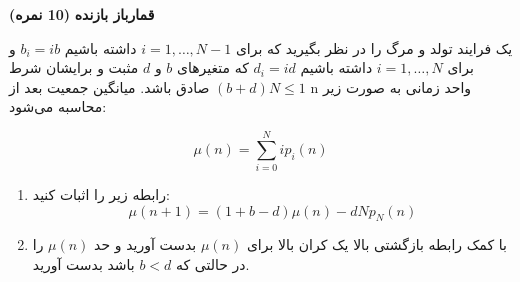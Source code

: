 \Large \textbf{قمارباز بازنده}
\large \textbf{(10 نمره)}

\normalsize \vspace{0.5cm}

یک فرایند تولد و مرگ را در نظر بگیرید که برای
$i = 1, \ldots ,N - 1$
داشته باشیم
${b_i} = ib$
و برای 
$i = 1, \ldots ,N$
داشته باشیم
${d_i} = id$
که
متغیرهای $b$ و $d$ مثبت و برایشان شرط
$\left( {b + d} \right)N \le 1$
صادق باشد.
میانگین جمعیت بعد از n واحد زمانی به صورت زیر محاسبه می‌شود:

$$
\mu \left( n \right) = \sum\limits_{i = 0}^N {i{p_i}\left( n \right)} 
$$



\begin{enumerate}[label=(\alph*)]
	
	\item
	رابطه زیر را اثبات کنید:
	$$
	\mu \left( {n + 1} \right) = (1 + b - d)\mu \left( n \right) - dN{p_N}\left( n \right)
	$$
	
	\item
	با کمک رابطه بازگشتی بالا یک کران بالا برای
	$\mu \left( n \right)$
	بدست آورید و حد 
	$\mu \left( n \right)$
	را در حالتی که
	$b < d$
	باشد بدست آورید.
	
\end{enumerate}